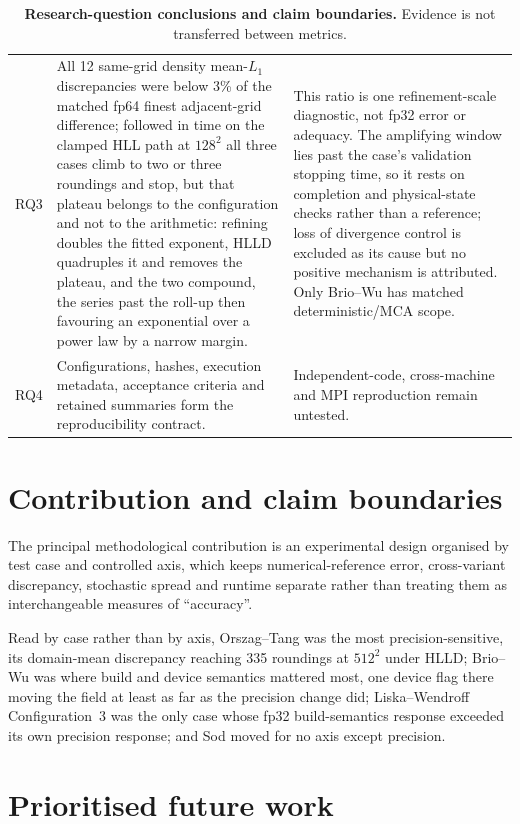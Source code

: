 \begin{table}[H]
\begin{tabularx}{\textwidth}{@{}p{}XX@{}}
RQ3 & All 12 same-grid density mean-$L_1$ discrepancies were below 3\% of the
matched fp64 finest adjacent-grid difference; followed in time on the clamped
HLL path at $128^2$ all three cases climb to two or three roundings and stop,
but that plateau belongs to the configuration and not to the arithmetic:
refining doubles the fitted exponent, HLLD quadruples it and removes the
plateau, and the two compound, the series past the roll-up then favouring an
exponential over a power law by a narrow margin. & This
ratio is one refinement-scale diagnostic, not fp32 error or adequacy. The
amplifying window lies past the case's validation stopping time, so it rests on
completion and physical-state checks rather than a reference; loss of
divergence control is excluded as its cause but no positive mechanism is
attributed. Only Brio--Wu has matched deterministic/MCA scope. \\
RQ4 & Configurations, hashes, execution metadata, acceptance criteria and retained summaries
form the reproducibility contract. & Independent-code, cross-machine and MPI
reproduction remain untested. \\
\bottomrule
\end{tabularx}
\caption[Research-question conclusions]{\textbf{Research-question conclusions
and claim boundaries.} Evidence is not transferred between metrics.}
\label{tab:ch7-conclusion-matrix}
\end{table}

\section{Contribution and claim boundaries}

The principal methodological contribution is an experimental design organised
by test case and controlled axis, which keeps numerical-reference error,
cross-variant discrepancy, stochastic spread and runtime separate rather than
treating them as interchangeable measures of ``accuracy''.

Read by case rather than by axis, Orszag--Tang was the most precision-sensitive,
its domain-mean discrepancy reaching 335 roundings at $512^2$ under HLLD;
Brio--Wu was where build and device semantics mattered most, one device flag
there moving the field at least as far as the precision change did;
Liska--Wendroff Configuration~3 was the only case whose fp32 build-semantics
response exceeded its own precision response; and Sod moved for no axis except
precision.

\section{Prioritised future work}

